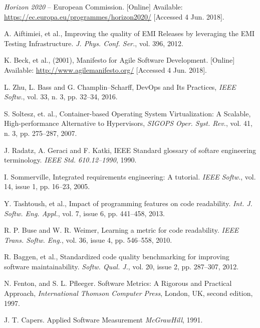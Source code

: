 \documentclass[journal]{IEEEtran}
\begin{document}
\begin{thebibliography}{1}

\emph{Horizon 2020} -- European Commission.
[Online] Available: \url{https://ec.europa.eu/programmes/horizon2020/}
[Accessed 4 Jun. 2018].

A. Aiftimiei, et al.,
Improving the quality of EMI Releases by leveraging the
EMI Testing Infrastructure.
\emph{J. Phys. Conf. Ser.},
vol. 396, 2012.

K. Beck, et al., (2001),
Manifesto for Agile Software Development.
[Online] Available: \url{http://www.agilemanifesto.org/}
[Accessed 4 Jun. 2018].

L. Zhu, L. Bass and G. Champlin--Scharff,
DevOps and Its Practices,
\emph{IEEE Softw.},
vol. 33, n. 3, pp. 32--34, 2016.

S. Soltesz, et. al.,
Container-based Operating System Virtualization: A Scalable, High-performance Alternative to Hypervisors,
\emph{SIGOPS Oper. Syst. Rev.},
vol. 41, n. 3, pp. 275--287, 2007.

J. Radatz, A. Geraci and F. Katki,
IEEE Standard glossary of softare engineering terminology.
\emph{IEEE Std. 610.12--1990}, 1990.

I. Sommerville,
Integrated requirements engineering: A tutorial.
\emph{IEEE Softw.},
vol. 14, issue 1, pp. 16--23, 2005.

Y. Tashtoush, et al.,
Impact of programming features on code readability.
\emph{Int. J. Softw. Eng. Appl.}, 
vol. 7, issue 6, pp. 441--458, 2013.

R. P. Buse and W. R. Weimer,
Learning a metric for code readability.
\emph{IEEE Trans. Softw. Eng.},
vol. 36, issue 4, pp. 546--558, 2010.

R. Baggen, et al.,
Standardized code quality benchmarking for improving software maintainability.
\emph{Softw. Qual. J.},
vol. 20, issue 2, pp. 287--307, 2012.







N.  Fenton,  and  S.  L.  Pfleeger.
Software  Metrics:  A  Rigorous  and  Practical Approach,
\emph{International Thomson Computer
Press}, London, UK, second edition, 1997. 

J. T. Capers.
Applied Software Measurement
\emph{McGrawHill}, 1991. 


\end{thebibliography}
\end{document}
